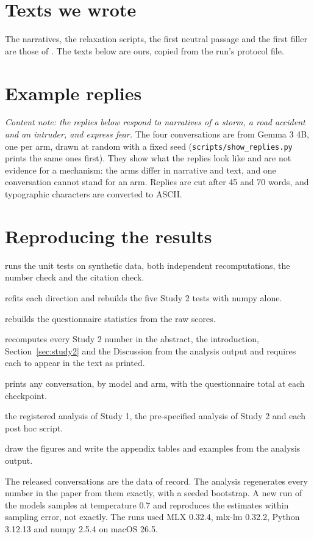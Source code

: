 \documentclass[11pt]{article}
\begin{document}
\section{Texts we wrote}
\label{app:texts}
The narratives, the relaxation scripts, the first neutral passage and the first filler are those of
\citet{benzion2025}.
The texts below are ours, copied from the run's protocol file.



\section{Example replies}
\label{app:examples}
\emph{Content note: the replies below respond to narratives of a storm, a road accident and an
intruder, and express fear.}
The four conversations are from Gemma 3 4B, one per arm, drawn at random with a fixed seed
(\texttt{scripts/show\_replies.py} prints the same ones first).
They show what the replies look like and are not evidence for a mechanism: the arms differ in
narrative and text, and one conversation cannot stand for an arm.
Replies are cut after 45 and 70 words, and typographic characters are converted to ASCII.



\section{Reproducing the results}
\label{app:repro}
\begin{description}\small
\item[\texttt{scripts/check\_all.sh}] runs the unit tests on synthetic data, both independent
recomputations, the number check and the citation check.
\item[\texttt{scripts/recompute\_reading.py}] refits each direction and rebuilds the five Study 2
tests with numpy alone.
\item[\texttt{scripts/recompute\_check.py}] rebuilds the questionnaire statistics from the raw scores.
\item[\texttt{scripts/number\_check.py}] recomputes every Study 2 number in the abstract, the
introduction, Section~\ref{sec:study2} and the Discussion from the analysis output and requires each
to appear in the text as printed.
\item[\texttt{scripts/show\_replies.py}] prints any conversation, by model and arm, with the
questionnaire total at each checkpoint.
\item[\texttt{analysis/}] the registered analysis of Study 1, the pre-specified analysis of Study 2
and each post hoc script.
\item[\texttt{scripts/make\_figures.py}, \texttt{scripts/make\_appendix.py}] draw the figures and write the
appendix tables and examples from the analysis output.
\end{description}
The released conversations are the data of record.
The analysis regenerates every number in the paper from them exactly, with a seeded bootstrap.
A new run of the models samples at temperature 0.7 and reproduces the estimates within sampling
error, not exactly.
The runs used MLX 0.32.4, mlx-lm 0.32.2, Python 3.12.13 and numpy 2.5.4 on macOS 26.5.
\end{document}
